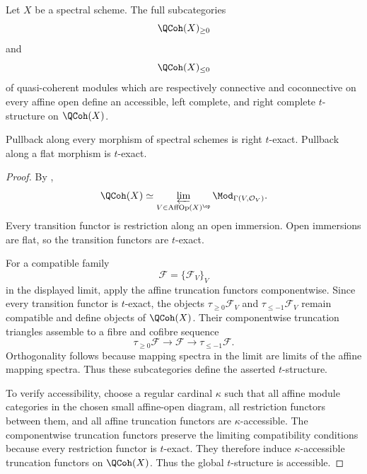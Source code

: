 \begin{theorem}
\label{thm:qcoh-spectral-scheme-t-structure}
Let $X$ be a spectral scheme. The full subcategories
\[
    \QCoh(X)_{\geq0}
\]
and
\[
    \QCoh(X)_{\leq0}
\]
of quasi-coherent modules which are respectively connective and
coconnective on every affine open define an accessible, left complete,
and right complete $t$-structure on $\QCoh(X)$.

Pullback along every morphism of spectral schemes is right $t$-exact.
Pullback along a flat morphism is $t$-exact.
\end{theorem}

\begin{proof}
By ,
\[
    \QCoh(X)
    \simeq
    \varprojlim_
    {V\in\operatorname{AffOp}(X)^{\op}}
    \Mod_{\Gamma(V,\mathcal O_V)}.
\]
Every transition functor is restriction along an open immersion. Open
immersions are flat, so the transition functors are $t$-exact.

For a compatible family
\[
    \mathcal F
    =
    \{\mathcal F_V\}_V
\]
in the displayed limit, apply the affine truncation functors
componentwise. Since every transition functor is $t$-exact, the objects
$\tau_{\geq0}\mathcal F_V$ and $\tau_{\leq-1}\mathcal F_V$ remain
compatible and define objects of $\QCoh(X)$. Their componentwise
truncation triangles assemble to a fibre and cofibre sequence
\[
    \tau_{\geq0}\mathcal F
    \longrightarrow
    \mathcal F
    \longrightarrow
    \tau_{\leq-1}\mathcal F.
\]
Orthogonality follows because mapping spectra in the limit are limits of
the affine mapping spectra. Thus these subcategories define the asserted
$t$-structure.

To verify accessibility, choose a regular cardinal $\kappa$ such that
all affine module categories in the chosen small affine-open diagram, all
restriction functors between them, and all affine truncation functors are
$\kappa$-accessible. The componentwise truncation functors preserve the
limiting compatibility conditions because every restriction functor is
$t$-exact. They therefore induce $\kappa$-accessible truncation functors
on $\QCoh(X)$. Thus the global $t$-structure is accessible.


\end{proof}
